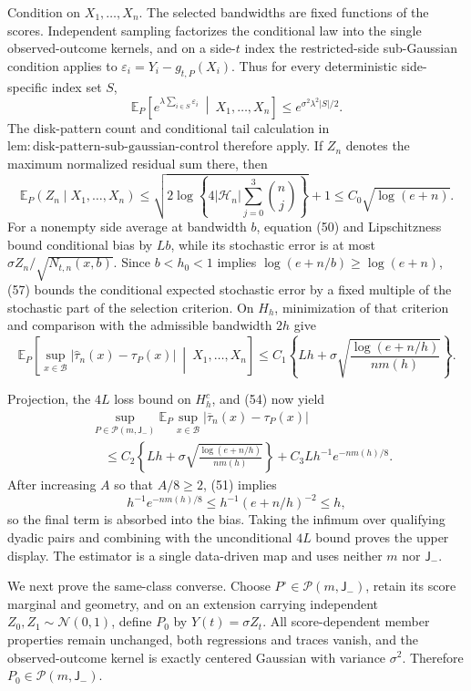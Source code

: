 Condition on \(X_1,\ldots,X_n\).  The selected bandwidths are fixed
functions of the scores.  Independent sampling factorizes the conditional
law into the single observed-outcome kernels, and on a side-\(t\) index
the restricted-side sub-Gaussian condition applies to
\(\varepsilon_i=Y_i-g_{t,P}(X_i)\).  Thus for every deterministic
side-specific index set \(S\),
\[
 \mathbb E_P\!\left[
 e^{\lambda\sum_{i\in S}\varepsilon_i}
 \ \middle|\ X_1,\ldots,X_n\right]
 \le e^{\sigma^2\lambda^2|S|/2}.
 \tag{56}
\]
The disk-pattern count and conditional tail calculation in
\(\mathrm{lem:disk\text{-}pattern\text{-}sub\text{-}gaussian\text{-}control}\)
therefore apply.  If \(Z_n\) denotes the maximum normalized residual sum
there, then
\[
 \mathbb E_P(Z_n\mid X_1,\ldots,X_n)
 \le\sqrt{2\log\!\left\{4|\mathcal H_n|
              \sum_{j=0}^3\binom nj\right\}}+1
 \le C_0\sqrt{\log(e+n)}.
 \tag{57}
\]
For a nonempty side average at bandwidth \(b\), equation (50) and
Lipschitzness bound conditional bias by \(Lb\), while its stochastic
error is at most \(\sigma Z_n/\sqrt{N_{t,n}(x,b)}\).  Since \(b<h_0<1\)
implies \(\log(e+n/b)\ge\log(e+n)\), (57) bounds the conditional expected
stochastic error by a fixed multiple of the stochastic part of the
selection criterion.  On \(H_h\), minimization of that criterion and
comparison with the admissible bandwidth \(2h\) give
\[
 \mathbb E_P\!\left[
 \sup_{x\in\mathcal B}|\widehat\tau_n(x)-\tau_P(x)|
 \ \middle|\ X_1,\ldots,X_n\right]
 \le C_1\left\{Lh+
 \sigma\sqrt{\frac{\log(e+n/h)}{nm(h)}}\right\}.
 \tag{58}
\]

Projection, the \(4L\) loss bound on \(H_h^c\), and (54) now yield
\[
 \begin{aligned}
 &\sup_{P\in\mathcal P(m,\mathsf J_{-})}
 \mathbb E_P\sup_{x\in\mathcal B}
 |\overline\tau_n(x)-\tau_P(x)|\\
 &\quad\le C_2\left\{Lh+
 \sigma\sqrt{\frac{\log(e+n/h)}{nm(h)}}\right\}
 +C_3Lh^{-1}e^{-nm(h)/8}.
 \end{aligned}
 \tag{59}
\]
After increasing \(A\) so that \(A/8\ge2\), (51) implies
\[
 h^{-1}e^{-nm(h)/8}\le h^{-1}(e+n/h)^{-2}\le h,
\]
so the final term is absorbed into the bias.  Taking the infimum over
qualifying dyadic pairs and combining with the unconditional \(4L\)
bound proves the upper display.  The estimator is a single data-driven
map and uses neither \(m\) nor \(\mathsf J_{-}\).

We next prove the same-class converse.  Choose
\(P^\circ\in\mathcal P(m,\mathsf J_{-})\), retain its score marginal and
geometry, and on an extension carrying independent
\(Z_0,Z_1\sim\mathcal N(0,1)\), define \(P_0\) by
\(Y(t)=\sigma Z_t\).  All score-dependent member properties remain
unchanged, both regressions and traces vanish, and the observed-outcome
kernel is exactly centered Gaussian with variance \(\sigma^2\).
Therefore \(P_0\in\mathcal P(m,\mathsf J_{-})\).

